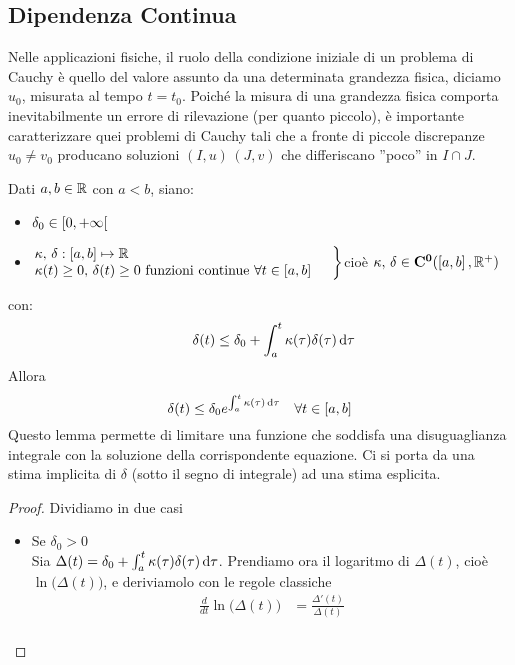 \subsection{Dipendenza Continua}
Nelle applicazioni fisiche, il ruolo della condizione iniziale di un problema di Cauchy è quello del valore assunto da una determinata grandezza fisica, diciamo $u_0$, misurata al tempo $t=t_0$. Poiché la misura di una grandezza fisica comporta inevitabilmente un errore di rilevazione (per quanto piccolo), è importante caratterizzare quei problemi di Cauchy tali che a fronte di piccole discrepanze $u_0 \neq v_0$ producano soluzioni $(I,u)\,(J,v)$ che differiscano ”poco” in $I\cap J$.
\begin{lemma}
	\label{lemma:gronwall}
	Dati $a,b\in \mathbb{R}$ con $a < b$, siano:
	\begin{itemize}
		\item $\delta_0\in \left[0,+\infty\right[$
		\item $\hspace{-0.5em}\left.\begin{array}{ll}
				\kappa,\,\delta:\left[a,b\right]\mapsto \mathbb{R} \\
				\kappa(t)\geq 0,\,\delta(t) \geq 0 \text{ funzioni continue } \forall t \in \left[a,b\right]
		\end{array} \quad\right\}$\quad cioè \quad$\kappa,\,\delta\in\mathbf{C^{0}}(\left[a,b\right],\mathbb{R}^{+})$
	\end{itemize}
	con:
	$$\qquad \delta(t)\le \delta_0+\int_{a}^{t}\kappa(\tau)\delta(\tau)\,\mathrm{d}{\tau}$$
	Allora
	$$\delta(t)\le\delta_0e^{\int_{a}^{t}\kappa(\tau)\,\mathrm{d}{\tau}} \quad \forall t \in \left[a,b\right]$$
	Questo lemma permette di limitare una funzione che soddisfa una disuguaglianza integrale con la soluzione della corrispondente equazione. Ci si porta da una stima implicita di $\delta$ (sotto il segno di integrale) ad una stima esplicita.
	\begin{proof}
		Dividiamo in due casi
		\begin{itemize}
			\item Se $\delta_0>0$\\
				Sia $\Delta(t) = \delta_0+\int_{a}^{t}\kappa(\tau)\delta(\tau)\,\mathrm{d}{\tau}$. Prendiamo ora il logaritmo di $\Delta(t)$, cioè $\ln{\bigl(\Delta(t)\bigr)}$, e deriviamolo con le regole classiche
				\begin{align*}
					\frac{d}{dt}\ln{\bigl(\Delta(t)\bigr)} &= \frac{\Delta'(t)}{\Delta(t)}\\

\end{align*}
\end{itemize}
\end{proof}
\end{lemma}
